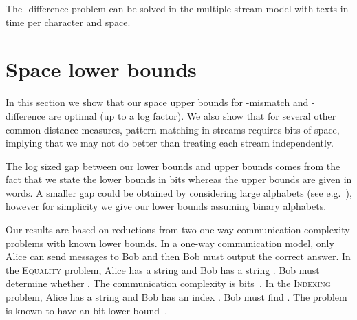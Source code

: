 \documentclass[envcountsame]{llncs}
\newcommand{\indexing}{\textsc{Indexing}\xspace}
\newcommand{\equality}{\textsc{Equality}\xspace}
\begin{document}
\begin{theorem}
    The -difference problem can be solved in the multiple stream model with  texts in  time per character and  space.
\end{theorem}


\section{Space lower bounds}\label{sec:space}

In this section we show that our space upper bounds for -mismatch
and -difference are optimal (up to a log factor). We also show
that for several other common distance measures, pattern matching in  streams requires  bits of space, implying that we may not do better than treating each stream independently.

The log sized gap between our lower bounds and upper bounds comes from
the fact that we state the lower bounds in bits whereas the upper
bounds are given in words. A smaller gap could be obtained by
considering large alphabets (see e.g.\@~\cite{CJPS:2011}), however for
simplicity we give our lower bounds assuming binary alphabets.

Our results are based on reductions from two one-way communication complexity problems with known lower bounds.
In a one-way communication model, only Alice can send messages to Bob and then Bob must output the correct answer.
In the \equality problem, Alice has a string  and Bob has a string . Bob must determine whether . The communication complexity is  bits~\cite{Kushilevitz:97}.
In the \indexing problem, Alice has a string  and Bob has an index . Bob must find . The problem is known to have an  bit lower bound~\cite{Kushilevitz:97}.
\end{document}
